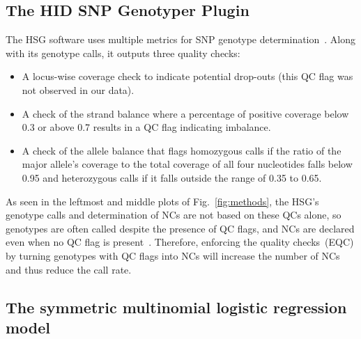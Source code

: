 \documentclass[preprint,5p,times,11pt]{elsarticle}
\begin{document}
\subsection{The HID SNP Genotyper Plugin}
The HSG software uses multiple metrics for SNP genotype determination~\cite[p.~35]{hid}.
Along with its genotype calls, it outputs three quality checks:
\begin{itemize}
\item A locus-wise coverage check to indicate potential drop-outs (this QC flag was not observed in our data).
\item A check of the strand balance where a percentage of positive coverage below 0.3 or above 0.7 results in a QC flag indicating imbalance.
\item A check of the allele balance that flags homozygous calls if the ratio of the major allele's coverage to the total coverage of all four nucleotides falls below 0.95 and heterozygous calls if it falls outside the range of 0.35 to 0.65.
\end{itemize}
As seen in the leftmost and middle plots of Fig.~\ref{fig:methods}, the HSG's genotype calls and determination of NCs are not based on these QCs alone, so genotypes are often called despite the presence of QC flags, and NCs are declared even when no QC flag is present~\cite[p.~35]{hid}.
Therefore, enforcing the quality checks~(EQC) by turning genotypes with QC flags into NCs will increase the number of NCs and thus reduce the call rate.


\subsection{The symmetric multinomial logistic regression model}
\end{document}
